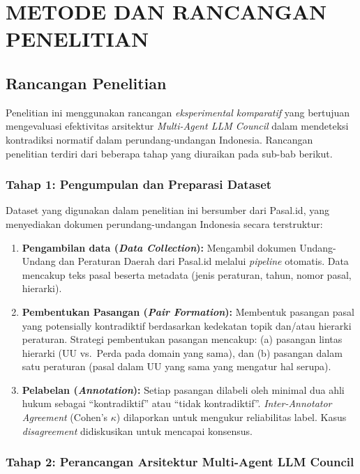 \chapter{METODE DAN RANCANGAN PENELITIAN}

\section{Rancangan Penelitian}

Penelitian ini menggunakan rancangan \textit{eksperimental komparatif} yang bertujuan mengevaluasi efektivitas arsitektur \textit{Multi-Agent LLM Council} dalam mendeteksi kontradiksi normatif dalam perundang-undangan Indonesia. Rancangan penelitian terdiri dari beberapa tahap yang diuraikan pada sub-bab berikut.

\subsection{Tahap 1: Pengumpulan dan Preparasi Dataset}

Dataset yang digunakan dalam penelitian ini bersumber dari Pasal.id, yang menyediakan dokumen perundang-undangan Indonesia secara terstruktur:
\begin{enumerate}
	\item \textbf{Pengambilan data (\textit{Data Collection}):} Mengambil dokumen Undang-Undang dan Peraturan Daerah dari Pasal.id melalui \textit{pipeline} otomatis. Data mencakup teks pasal beserta metadata (jenis peraturan, tahun, nomor pasal, hierarki).
	\item \textbf{Pembentukan Pasangan (\textit{Pair Formation}):} Membentuk pasangan pasal yang potensially kontradiktif berdasarkan kedekatan topik dan/atau hierarki peraturan. Strategi pembentukan pasangan mencakup: (a) pasangan lintas hierarki (UU vs.\ Perda pada domain yang sama), dan (b) pasangan dalam satu peraturan (pasal dalam UU yang sama yang mengatur hal serupa).
	\item \textbf{Pelabelan (\textit{Annotation}):} Setiap pasangan dilabeli oleh minimal dua ahli hukum sebagai ``kontradiktif'' atau ``tidak kontradiktif''. \textit{Inter-Annotator Agreement} (Cohen's $\kappa$) dilaporkan untuk mengukur reliabilitas label. Kasus \textit{disagreement} didiskusikan untuk mencapai konsensus.
\end{enumerate}

\subsection{Tahap 2: Perancangan Arsitektur Multi-Agent LLM Council}

